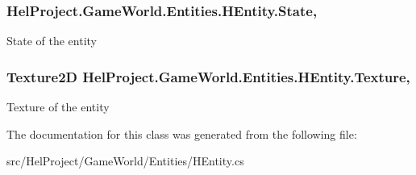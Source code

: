 \subsubsection[{State}]{ Hel\+Project.\+Game\+World.\+Entities.\+H\+Entity.\+State\hspace{0.3cm}{\ttfamily [get]}, {\ttfamily [set]}}\label{class_hel_project_1_1_game_world_1_1_entities_1_1_h_entity_a2e904ad6fe707cadd501a423e4768a0d}


State of the entity 

\hypertarget{class_hel_project_1_1_game_world_1_1_entities_1_1_h_entity_a11ba8f188ffd338f024d396ab0b27cbb}{}
\subsubsection[{Texture}]{\setlength{\rightskip}{0pt plus 5cm}Texture2\+D Hel\+Project.\+Game\+World.\+Entities.\+H\+Entity.\+Texture\hspace{0.3cm}{\ttfamily [get]}, {\ttfamily [set]}}\label{class_hel_project_1_1_game_world_1_1_entities_1_1_h_entity_a11ba8f188ffd338f024d396ab0b27cbb}


Texture of the entity 



The documentation for this class was generated from the following file\+:\begin{DoxyCompactItemize}
\item 
src/\+Hel\+Project/\+Game\+World/\+Entities/H\+Entity.\+cs\end{DoxyCompactItemize}
